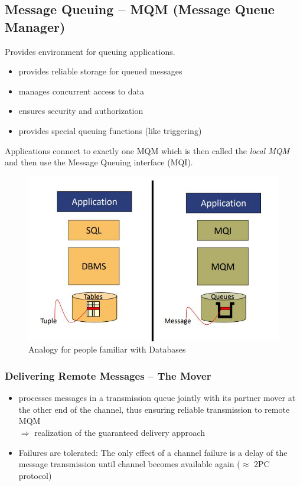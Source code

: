 		\subsection{Message Queuing -- MQM (Message Queue Manager)}
				 Provides environment for queuing applications. 
				 \begin{itemize}
				 	\item provides reliable storage for queued messages
				 	\item manages concurrent access to data
				 	\item ensures security and authorization
				 	\item provides special queuing functions (like triggering)
				 \end{itemize}
				 Applications connect to exactly one MQM which is then called the \textit{local MQM} and then use the Message Queuing interface (MQI).
				 \begin{figure}[h!]
				 	\includegraphics[scale=0.4]{res/mqm-analogy-dbs.jpg}
				 	\caption{Analogy for people familiar with Databases}
				 \end{figure}
			 
			 \subsubsection{Delivering Remote Messages -- The Mover}
			 \begin{itemize}
			 	\item processes messages in a transmission queue jointly with its partner mover at the other end of the channel, thus ensuring reliable transmission to	remote MQM\\
			 	$ \Rightarrow $ realization of the guaranteed delivery approach
			 	
			 	\item  Failures are tolerated: The only effect of a channel failure is a delay of the message transmission until channel becomes available again ($ \approx $ 2PC protocol)
			 \end{itemize}
		 
